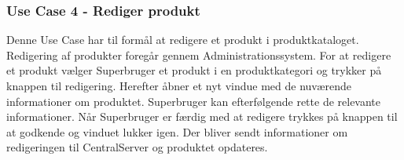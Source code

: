 \subsubsection{Use Case 4 - Rediger produkt}
Denne Use Case har til formål at redigere et produkt i produktkataloget. Redigering af produkter foregår gennem Administrationssystem. For at redigere et produkt vælger Superbruger et produkt i en produktkategori og trykker på knappen til redigering. Herefter åbner et nyt vindue med de nuværende informationer om produktet. Superbruger kan efterfølgende rette de relevante informationer. Når Superbruger er færdig med at redigere trykkes på knappen til at godkende og vinduet lukker igen. Der bliver sendt informationer om redigeringen til CentralServer og produktet opdateres.
